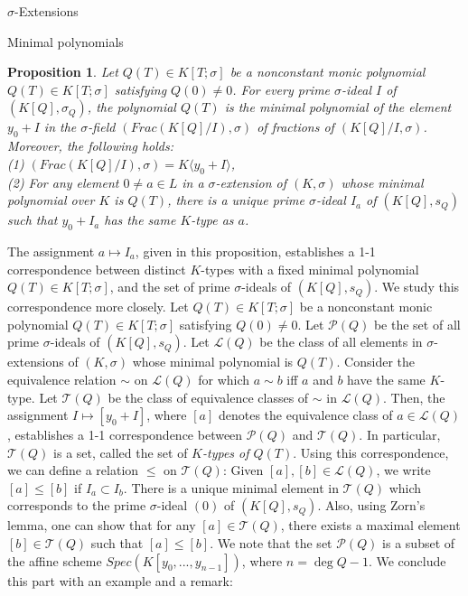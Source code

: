 \documentclass[11pt,a4paper]{article}
\theoremstyle{theorem}
\newtheorem{proposition}[theorem]{Proposition}
\numberwithin{equation}{section}
\newcommand{\s}{\sigma}
\begin{document}
\begin{section}{$\s$-Extensions}
\begin{subsection}{Minimal polynomials}
\begin{proposition}
		Let $Q(T)\in K[T;\s]$ be a nonconstant monic polynomial $Q(T)\in K[T;\s]$ satisfying $Q(0)\neq 0$. For every prime $\s$-ideal $I$ of $(K[Q],\s_Q)$, the polynomial $Q(T)$ is the minimal polynomial of the element $y_0+I$ in the $\s$-field $(Frac(K[Q]/I),\s)$ of fractions of $(K[Q]/I,\s)$. Moreover,  the following holds:\\
		(1) $(Frac(K[Q]/I),\s)=K\langle y_0+I\rangle$, \\
		(2) For any element $0\neq a\in L$ in a $\s$-extension of $(K,\s)$ whose minimal polynomial over $K$ is $Q(T)$, there is a unique prime $\s$-ideal $I_a$ of $(K[Q],s_Q)$ such that $y_0+I_a$ has the same $K$-type as $a$.    
	\end{proposition}
	The assignment $a\mapsto I_a$, given in this proposition, establishes a 1-1 correspondence between distinct $K$-types with a fixed minimal polynomial $Q(T)\in K[T;\s]$, and the set of prime $\s$-ideals of $(K[Q],s_Q)$. We study this correspondence more closely. Let $Q(T)\in K[T;\s]$ be a nonconstant monic polynomial $Q(T)\in K[T;\s]$ satisfying $Q(0)\neq 0$. Let $\mathcal{P}(Q)$ be the set of all prime  $\s$-ideals of $(K[Q],s_Q)$. Let $\mathcal{L}(Q)$ be the class of all elements in $\s$-extensions of $(K,\s)$ whose minimal polynomial is $Q(T)$. Consider the equivalence relation $\sim$ on $\mathcal{L}(Q)$ for which $a\sim b$ iff $a$ and $b$ have the same $K$-type. Let $\mathcal{T}(Q)$ be the class of equivalence classes of $\sim$ in $\mathcal{L}(Q)$. Then, the assignment
	$I\mapsto [y_0+I]$, where $[a]$ denotes the equivalence class of $a\in \mathcal{L}(Q)$, establishes a 1-1 correspondence between  $\mathcal{P}(Q)$ and $\mathcal{T}(Q)$. In particular, $\mathcal{T}(Q)$  is a set, called the set of \textit{$K$-types of $Q(T)$}. Using this correspondence, we can define a relation $\leq $ on $\mathcal{T}(Q)$: Given $[a],[b]\in \mathcal{L}(Q)$, we write $[a]\leq [b]$ if $I_a\subset I_b$. There is a unique minimal element in $\mathcal{T}(Q)$ which corresponds to the prime $\s$-ideal $(0)$ of $(K[Q],s_Q)$. Also, using Zorn's lemma, one can show that for any $[a]\in \mathcal{T}(Q)$, there exists a maximal element $[b]\in \mathcal{T}(Q)$ such that $[a]\leq [b]$. We note that the set $\mathcal{P}(Q)$  is a subset of the affine scheme $Spec(K[y_0,...,y_{n-1}])$, where $n=\deg Q-1$. We conclude this part with an example and a remark: 


\end{subsection}
\end{section}
\end{document}
